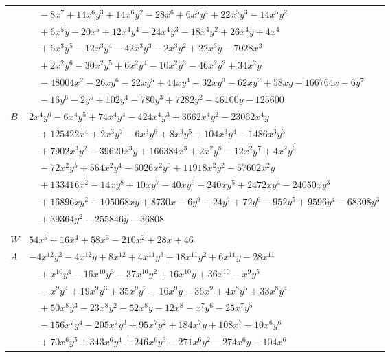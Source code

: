 \documentclass[11pt]{article}
\begin{document}
\begin{longtable}{@{}ll@{}}
 & $\quad -8x^{7}+14x^{6}y^{3}+14x^{6}y^{2}-28x^{6}+6x^{5}y^{4}+22x^{5}y^{3}-14x^{5}y^{2}$\\
 & $\quad +6x^{5}y-20x^{5}+12x^{4}y^{4}-24x^{4}y^{3}-18x^{4}y^{2}+26x^{4}y+4x^{4}$\\
 & $\quad +6x^{3}y^{5}-12x^{3}y^{4}-42x^{3}y^{3}-2x^{3}y^{2}+22x^{3}y-7028x^{3}$\\
 & $\quad +2x^{2}y^{6}-30x^{2}y^{5}+6x^{2}y^{4}-10x^{2}y^{3}-46x^{2}y^{2}+34x^{2}y$\\
 & $\quad -48004x^{2}-26xy^{6}-22xy^{5}+44xy^{4}-32xy^{3}-62xy^{2}+58xy-166764x-6y^{7}$\\
 & $\quad -16y^{6}-2y^{5}+102y^{4}-780y^{3}+7282y^{2}-46100y-125600$\\
$B$ & $2x^{4}y^{6}-6x^{4}y^{5}+74x^{4}y^{4}-424x^{4}y^{3}+3662x^{4}y^{2}-23062x^{4}y$\\
 & $\quad +125422x^{4}+2x^{3}y^{7}-6x^{3}y^{6}+8x^{3}y^{5}+104x^{3}y^{4}-1486x^{3}y^{3}$\\
 & $\quad +7902x^{3}y^{2}-39620x^{3}y+166384x^{3}+2x^{2}y^{8}-12x^{2}y^{7}+4x^{2}y^{6}$\\
 & $\quad -72x^{2}y^{5}+564x^{2}y^{4}-6026x^{2}y^{3}+11918x^{2}y^{2}-57602x^{2}y$\\
 & $\quad +133416x^{2}-14xy^{8}+10xy^{7}-40xy^{6}-240xy^{5}+2472xy^{4}-24050xy^{3}$\\
 & $\quad +16896xy^{2}-105068xy+8730x-6y^{9}-24y^{7}+72y^{6}-952y^{5}+9596y^{4}-68308y^{3}$\\
 & $\quad +39364y^{2}-255846y-36808$\\
\addlinespace[3pt]
\multicolumn{2}{@{}l}{$g=2$, $i=20$, $m=1$, neighbours $4,5,6,9,17,27,28,30,32,35,41,42$}\\
$W$ & $54x^{5}+16x^{4}+58x^{3}-210x^{2}+28x+46$\\
$A$ & $-4x^{12}y^{2}-4x^{12}y+8x^{12}+4x^{11}y^{3}+18x^{11}y^{2}+6x^{11}y-28x^{11}$\\
 & $\quad +x^{10}y^{4}-16x^{10}y^{3}-37x^{10}y^{2}+16x^{10}y+36x^{10}-x^{9}y^{5}$\\
 & $\quad -x^{9}y^{4}+19x^{9}y^{3}+35x^{9}y^{2}-16x^{9}y-36x^{9}+4x^{8}y^{5}+33x^{8}y^{4}$\\
 & $\quad +50x^{8}y^{3}-23x^{8}y^{2}-52x^{8}y-12x^{8}-x^{7}y^{6}-25x^{7}y^{5}$\\
 & $\quad -156x^{7}y^{4}-205x^{7}y^{3}+95x^{7}y^{2}+184x^{7}y+108x^{7}-10x^{6}y^{6}$\\
 & $\quad +70x^{6}y^{5}+343x^{6}y^{4}+246x^{6}y^{3}-271x^{6}y^{2}-274x^{6}y-104x^{6}$\\

\end{longtable}
\end{document}
